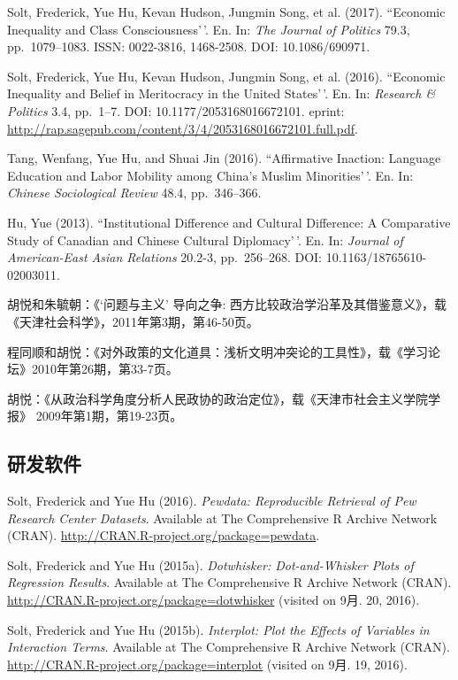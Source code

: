 \documentclass[10.5pt,]{article}
\begin{document}
 Solt, Frederick, Yue Hu, Kevan Hudson, Jungmin Song, et al. (2017).
 ``Economic Inequality and Class Consciousness'\,'. En. In:
 \emph{The Journal of Politics} 79.3, pp.~1079--1083. ISSN: 0022-3816,
 1468-2508. DOI: 10.1086/690971.

 Solt, Frederick, Yue Hu, Kevan Hudson, Jungmin Song, et al. (2016).
 ``Economic Inequality and Belief in Meritocracy in the United
 States'\,'. En. In: \emph{Research \& Politics} 3.4, pp.~1--7. DOI:
 10.1177/2053168016672101. eprint:
 \url{http://rap.sagepub.com/content/3/4/2053168016672101.full.pdf}.

 Tang, Wenfang, Yue Hu, and Shuai Jin (2016). ``Affirmative Inaction:
 Language Education and Labor Mobility among China's Muslim
 Minorities'\,'. En. In: \emph{Chinese Sociological Review} 48.4,
 pp.~346--366.

 Hu, Yue (2013). ``Institutional Difference and Cultural Difference: A
 Comparative Study of Canadian and Chinese Cultural Diplomacy'\,'. En.
 In: \emph{Journal of American-East Asian Relations} 20.2-3,
 pp.~256--268. DOI: 10.1163/18765610-02003011.

 胡悦和朱毓朝：《`问题与主义' 导向之争:
 西方比较政治学沿革及其借鉴意义》，载《天津社会科学》，2011年第3期，第46-50页。

 程同顺和胡悦：《对外政策的文化道具：浅析文明冲突论的工具性》，载《学习论坛》2010年第26期，第33-7页。

 胡悦：《从政治科学角度分析人民政协的政治定位》，载《天津市社会主义学院学报》
 2009年第1期，第19-23页。

 \hypertarget{ux7814ux53d1ux8f6fux4ef6}{%
 \subsection{研发软件}\label{ux7814ux53d1ux8f6fux4ef6}}

 Solt, Frederick and Yue Hu (2016).
 \emph{Pewdata: Reproducible Retrieval of Pew Research Center Datasets}.
 Available at The Comprehensive R Archive Network (CRAN).
 \url{http://CRAN.R-project.org/package=pewdata}.

 Solt, Frederick and Yue Hu (2015a).
 \emph{Dotwhisker: Dot-and-Whisker Plots of Regression Results}.
 Available at The Comprehensive R Archive Network (CRAN).
 \url{http://CRAN.R-project.org/package=dotwhisker} (visited on 9月. 20,
 2016).

 Solt, Frederick and Yue Hu (2015b).
 \emph{Interplot: Plot the Effects of Variables in Interaction Terms}.
 Available at The Comprehensive R Archive Network (CRAN).
 \url{http://CRAN.R-project.org/package=interplot} (visited on 9月. 19,
 2016).
\end{document}
